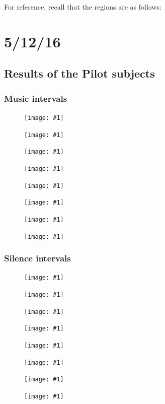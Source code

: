 \documentclass[11pt]{article}
\begin{document}
For reference, recall that the regions are as follows:


\section{5/12/16}
	\subsection{Results of the Pilot subjects}
	\subsubsection{Music intervals}
		\newcommand\trimmedgraphic[1]{%
		\texttt{[image: \#1]}%
		}
		\begin{figure}[H]
			\centering
			\trimmedgraphic{pictures/dodPilots/music1.png}
			\trimmedgraphic{pictures/dodPilots/music2.png}
			\trimmedgraphic{pictures/dodPilots/music3.png}
			\trimmedgraphic{pictures/dodPilots/music4.png}
			\trimmedgraphic{pictures/dodPilots/music5.png}
		\end{figure}

		\renewcommand\trimmedgraphic[1]{%
		\texttt{[image: \#1]}%
		}
		\begin{figure}[H]
			\centering
			\trimmedgraphic{pictures/dodPilots/cyc_music_permLocationsstd.png}
			\trimmedgraphic{pictures/dodPilots/cyc_music_permLocationsgray.png}
			\trimmedgraphic{pictures/dodPilots/cyc_music_phaseHist.png}
		\end{figure}

	\subsubsection{Silence intervals}
		\renewcommand\trimmedgraphic[1]{%
		\texttt{[image: \#1]}%
		}
		\begin{figure}[H]
		\centering
			\trimmedgraphic{pictures/dodPilots/silence1.png}
			\trimmedgraphic{pictures/dodPilots/silence2.png}
			\trimmedgraphic{pictures/dodPilots/silence3.png}
			\trimmedgraphic{pictures/dodPilots/silence4.png}
			\trimmedgraphic{pictures/dodPilots/silence5.png}
		\end{figure}

		\renewcommand\trimmedgraphic[1]{%
		\texttt{[image: \#1]}%
		}
		\begin{figure}[H]
		\centering
			\trimmedgraphic{pictures/dodPilots/cyc_silence_permLocationsstd.png}
			\trimmedgraphic{pictures/dodPilots/cyc_silence_permLocationsgray.png}
			\trimmedgraphic{pictures/dodPilots/cyc_silence_phaseHist.png}
		\end{figure}
\end{document}
